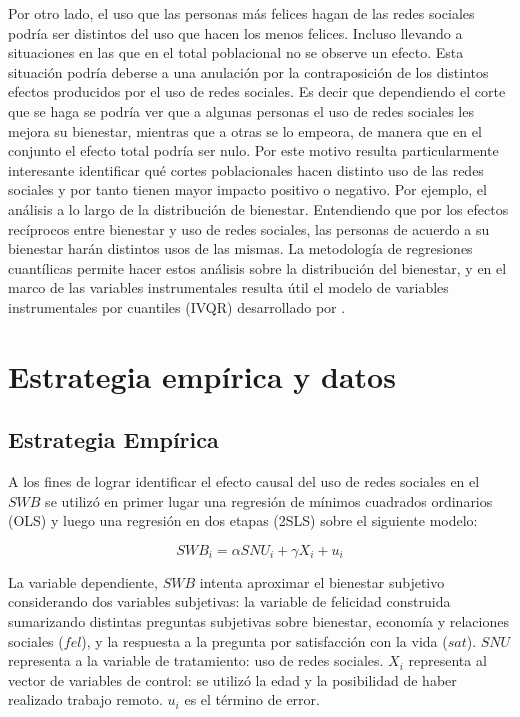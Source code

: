 \documentclass[11pt]{article}
\begin{document}
Por otro lado, el uso que las personas más felices hagan de las redes sociales podría ser distintos del uso que hacen los menos felices. Incluso llevando a situaciones en las que en el total poblacional no se observe un efecto. Esta situación podría deberse a una anulación por la contraposición de los distintos efectos producidos por el uso de redes sociales. Es decir que dependiendo el corte que se haga se podría ver que a algunas personas el uso de redes sociales les mejora su bienestar, mientras que a otras se lo empeora, de manera que en el conjunto el efecto total podría ser nulo. Por este motivo resulta particularmente interesante identificar qué cortes poblacionales hacen distinto uso de las redes sociales y por tanto tienen mayor impacto positivo o negativo. Por ejemplo, el análisis a lo largo de la distribución de bienestar. Entendiendo que por los efectos recíprocos entre bienestar y uso de redes sociales, las personas de acuerdo a su bienestar harán distintos usos de las mismas. La metodología de regresiones cuantílicas permite hacer estos análisis sobre la distribución del bienestar, y en el marco de las variables instrumentales resulta útil el modelo de variables instrumentales por cuantiles (IVQR) desarrollado por .


\section{Estrategia empírica y datos}
\subsection{Estrategia Empírica}
A los fines de lograr identificar el efecto causal del uso de redes sociales en el $SWB$ se utilizó en primer lugar una regresión de mínimos cuadrados ordinarios (OLS) y luego una regresión en dos etapas (2SLS) sobre el siguiente modelo: 

 \[SWB_i =  \alpha SNU_i + \gamma X_i + u_i \]

La variable dependiente, $SWB$ intenta aproximar el bienestar subjetivo considerando dos variables subjetivas: la variable de felicidad construida sumarizando distintas preguntas subjetivas sobre bienestar, economía y relaciones sociales ($fel$), y la respuesta a la pregunta por satisfacción con la vida ($sat$). $SNU$ representa a la variable de tratamiento: uso de redes sociales. $X_i$ representa al vector de variables de control: se utilizó la edad y la posibilidad de haber realizado trabajo remoto. $u_i$ es el término de error. 
\end{document}
